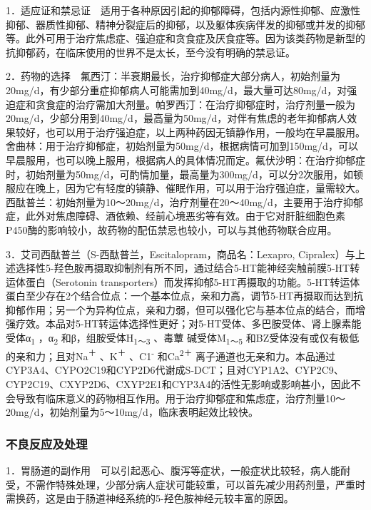 1．适应证和禁忌证　适用于各种原因引起的抑郁障碍，包括内源性抑郁、应激性抑郁、器质性抑郁、精神分裂症后的抑郁，以及躯体疾病伴发的抑郁或并发的抑郁等。此外可用于治疗焦虑症、强迫症和贪食症及厌食症等。因为该类药物是新型的抗抑郁药，在临床使用的世界不是太长，至今没有明确的禁忌证。

2．药物的选择　氟西汀：半衰期最长，治疗抑郁症大部分病人，初始剂量为20mg/d，有少部分重症抑郁病人可能需加到40mg/d，最大量可达80mg/d，对强迫症和贪食症的治疗需加大剂量。帕罗西汀：在治疗抑郁症时，治疗剂量一般为20mg/d，少部分用到40mg/d，最高量为50mg/d，对伴有焦虑的老年抑郁病人效果较好，也可以用于治疗强迫症，以上两种药因无镇静作用，一般均在早晨服用。舍曲林：用于治疗抑郁症，初始剂量为50mg/d，根据病情可加到150mg/d，可以早晨服用，也可以晚上服用，根据病人的具体情况而定。氟伏沙明：在治疗抑郁症时，初始剂量为50mg/d，可酌情加量，最高量为300mg/d，可以分2次服用，如顿服应在晚上，因为它有轻度的镇静、催眠作用，可以用于治疗强迫症，量需较大。西酞普兰：初始剂量为10～20mg/d，治疗剂量在20～40mg/d，主要用于治疗抑郁症，此外对焦虑障碍、酒依赖、经前心境恶劣等有效。由于它对肝脏细胞色素P450酶的影响较小，故药物的配伍禁忌也较小，可以与其他药物联合应用。

3．艾司西酞普兰（S-西酞普兰，Escitalopram，商品名：Lexapro,
Cipralex）与上述选择性5-羟色胺再摄取抑制剂有所不同，通过结合5-HT能神经突触前膜5-HT转运体蛋白（Serotonin
transporters）而发挥抑郁5-HT再摄取的功能。5-HT转运体蛋白至少存在2个结合位点：一个基本位点，亲和力高，调节5-HT再摄取而达到抗抑郁作用；另一个为异构位点，亲和力弱，但可以强化它与基本位点的结合，而增强疗效。本品对5-HT转运体选择性更好；对5-HT受体、多巴胺受体、肾上腺素能受体α\textsubscript{1}
，α\textsubscript{2} 和β，组胺受体H\textsubscript{1～3}
、毒蕈 碱受体M\textsubscript{1～5}
和BZ受体没有或仅有极低的亲和力；且对Na\textsuperscript{＋}
、K\textsuperscript{＋} 、C1\textsuperscript{-}
和Ca\textsuperscript{2＋}
离子通道也无亲和力。本品通过CYP3A4、CYPO2C19和CYP2D6代谢成S-DCT；且对CYP1A2、CYP2C9、CYP2C19、CXYP2D6、CXYP2E1和CYP3A4的活性无影响或影响甚小，因此不会导致有临床意义的药物相互作用。用于治疗抑郁症和焦虑症，治疗剂量10～20mg/d，初始剂量为5～10mg/d，临床表明起效比较快。

\subsubsection{不良反应及处理}

1．胃肠道的副作用　可以引起恶心、腹泻等症状，一般症状比较轻，病人能耐受，不需作特殊处理，少部分病人症状可能较重，可以首先减少用药剂量，严重时需换药，这是由于肠道神经系统的5-羟色胺神经元较丰富的原因。

